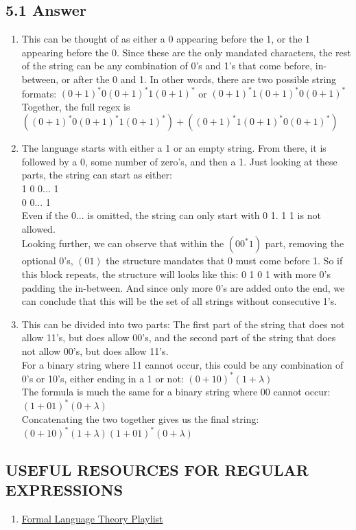 \documentclass{article}
\begin{document}
\subsection*{5.1 Answer}
\begin{enumerate}[label=\alph*.]
    \item This can be thought of as either a 0 appearing before the 1, or the 1 appearing before the 0. Since these are the only mandated characters, the rest of the string can be any combination of 0's and 1's that come before, in-between, or after the 0 and 1. In other words, there are two possible string formats: $(0+1)^*0(0+1)^*1(0+1)^*$ or $(0+1)^*1(0+1)^*0(0+1)^*$
    \\ Together, the full regex is $((0+1)^*0(0+1)^*1(0+1)^*)+((0+1)^*1(0+1)^*0(0+1)^*)$
    \item The language starts with either a 1 or an empty string. From there, it is followed by a 0, some number of zero's, and then a 1. Just looking at these parts, the string can start as either:
    \\ 1 0 0... 1 
    \\ 0 0... 1
    \\ Even if the 0... is omitted, the string can only start with 0 1. 1 1 is not allowed.
    \\ Looking further, we can observe that within the $(00^*1)$ part, removing the optional 0's, $(01)$ the structure mandates that 0 must come before 1. So if this block repeats, the structure will looks like this: 0 1 0 1 with more 0's padding the in-between. And since only more 0's are added onto the end, we can conclude that this will be the set of all strings without consecutive 1's.
    \item This can be divided into two parts: The first part of the string that does not allow 11's, but does allow 00's, and the second part of the string that does not allow 00's, but does allow 11's.
    \\ For a binary string where 11 cannot occur, this could be any combination of 0's or 10's, either ending in a 1 or not: $(0+10)^*(1+\lambda)$
    \\ The formula is much the same for a binary string where 00 cannot occur: $(1+01)^*(0+\lambda)$
    \\ Concatenating the two together gives us the final string: $(0+10)^*(1+\lambda)(1+01)^*(0+\lambda)$
\end{enumerate}
\newpage
\subsection*{USEFUL RESOURCES FOR REGULAR EXPRESSIONS}
\begin{enumerate}
    \item \href{https://www.youtube.com/playlist?list=PLBlnK6fEyqRgp46KUv4ZY69yXmpwKOIev}{Formal Language Theory Playlist}
\end{enumerate}
\newpage
\end{document}
